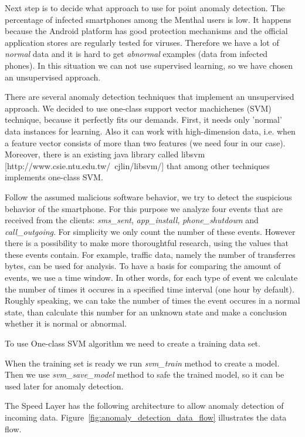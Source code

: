 Next step is to decide what approach to use for point anomaly detection.
The percentage of infected smartphones among the Menthal users is low.
It happens because the Android platform has good protection mechanisms and the official application stores are regularly tested for viruses.
Therefore we have a lot of \textit{normal} data and it is hard to get \textit{abnormal} examples (data from infected phones).
In this situation we can not use supervised learning, so we have chosen an unsupervised approach.

There are several anomaly detection techniques that implement an unsupervised approach.
We decided to use one-class support vector machichenes (SVM) technique, because it perfectly fits our demands.
First, it needs only 'normal' data instances for learning.
Also it can work with high-dimension data, i.e. when a feature vector consists of more than two features (we need four in our case).
Moreover, there is an existing java library called libsvm [http://www.csie.ntu.edu.tw/~cjlin/libsvm/] that among other techniques implements one-class SVM.

Follow the assumed malicious software behavior, we try to detect the suspicious behavior of the smartphone.
For this purpose we analyze four events that are received from the clients: \textit{sms\_sent}, \textit{app\_install}, \textit{phone\_shutdown} and \textit{call\_outgoing}.
For simplicity we only count the number of these events.
However there is a possibility to make more thoroughtful research, using the values that these events contain.
For example, traffic data, namely the number of transferres bytes, can be used for analysis.
To have a basis for comparing the amount of events, we use a time window.
In other words, for each type of event we calculate the number of times it occures in a specified time interval (one hour by default).
Roughly speaking, we can take the number of times the event occures in a normal state, than calculate this number for an unknown state and make a conclusion whether it is normal or abnormal.

To use One-class SVM algorithm we need to create a training data set.

When the training set is ready we run \textit{svm\_train} method to create a model.
Then we use \textit{svm\_save\_model} method to safe the trained model, so it can be used later for anomaly detection.

The Speed Layer has the following architecture to allow anomaly detection of incoming data.
Figure~\ref{fig:anomaly_detection_data_flow} illustrates the data flow.

